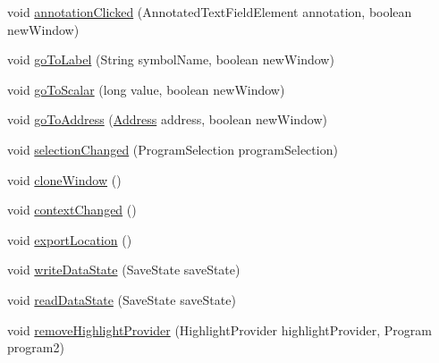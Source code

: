 \begin{DoxyCompactItemize}
\item 
void \mbox{\hyperlink{classghidra_1_1app_1_1plugin_1_1core_1_1decompile_1_1_decompiler_provider_a846c46957aac9b31e7fcb6fa8566f0fb}{annotation\+Clicked}} (Annotated\+Text\+Field\+Element annotation, boolean new\+Window)
\item 
void \mbox{\hyperlink{classghidra_1_1app_1_1plugin_1_1core_1_1decompile_1_1_decompiler_provider_a3012a2929e8b6f83e89da04ee89431d0}{go\+To\+Label}} (String symbol\+Name, boolean new\+Window)
\item 
void \mbox{\hyperlink{classghidra_1_1app_1_1plugin_1_1core_1_1decompile_1_1_decompiler_provider_aa4da717a0d4ecf7e1ac7b54ade004903}{go\+To\+Scalar}} (long value, boolean new\+Window)
\item 
void \mbox{\hyperlink{classghidra_1_1app_1_1plugin_1_1core_1_1decompile_1_1_decompiler_provider_af9cbc00f79147db02fcb654511044e78}{go\+To\+Address}} (\mbox{\hyperlink{class_address}{Address}} address, boolean new\+Window)
\item 
void \mbox{\hyperlink{classghidra_1_1app_1_1plugin_1_1core_1_1decompile_1_1_decompiler_provider_af5b6c269879799df67d4594c6df80434}{selection\+Changed}} (Program\+Selection program\+Selection)
\item 
void \mbox{\hyperlink{classghidra_1_1app_1_1plugin_1_1core_1_1decompile_1_1_decompiler_provider_abee9f64402916ef4a8d48c8e699173d9}{clone\+Window}} ()
\item 
void \mbox{\hyperlink{classghidra_1_1app_1_1plugin_1_1core_1_1decompile_1_1_decompiler_provider_a3a75d45714ac350137e8a1cef08a2241}{context\+Changed}} ()
\item 
void \mbox{\hyperlink{classghidra_1_1app_1_1plugin_1_1core_1_1decompile_1_1_decompiler_provider_a2814de1704038c1314a058a368640044}{export\+Location}} ()
\item 
void \mbox{\hyperlink{classghidra_1_1app_1_1plugin_1_1core_1_1decompile_1_1_decompiler_provider_afb67ba4cd117c62a268993e9cdf9a9db}{write\+Data\+State}} (Save\+State save\+State)
\item 
void \mbox{\hyperlink{classghidra_1_1app_1_1plugin_1_1core_1_1decompile_1_1_decompiler_provider_ade6f2cf204e79466191b7b7045614f94}{read\+Data\+State}} (Save\+State save\+State)
\item 
void \mbox{\hyperlink{classghidra_1_1app_1_1plugin_1_1core_1_1decompile_1_1_decompiler_provider_a9814a29a4014b8d901dd52f7b70396d3}{remove\+Highlight\+Provider}} (Highlight\+Provider highlight\+Provider, Program program2)
\item 

\end{DoxyCompactItemize}
